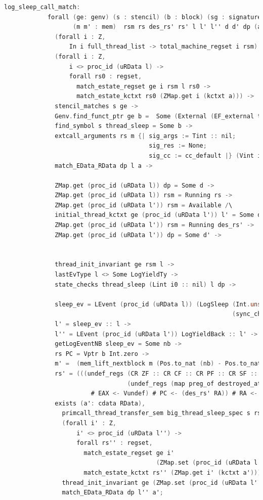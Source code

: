 \begin{lstlisting}[language=C]     
          log_sleep_call_match:
            forall (ge: genv) (s : stencil) (b : block) (sg : signature) 
                   (m m' : mem)  rsm rs des_rs' rs' l l' l'' d d' dp (a: cdata RData) nb sleep_ev i0,
              (forall i : Z,
                  In i full_thread_list -> total_machine_regset i rsm) ->
              (forall i : Z,
                  i <> proc_id (uRData l) ->
                  forall rs0 : regset,
                    match_estate_regset ge i rsm l rs0 ->
                    match_estate_kctxt rs0 (ZMap.get i (kctxt a))) ->
              stencil_matches s ge ->
              Genv.find_funct_ptr ge b =  Some (External (EF_external thread_sleep sg)) ->
              find_symbol s thread_sleep = Some b ->
              extcall_arguments rs m {| sig_args := Tint :: nil;
                                        sig_res := None;
                                        sig_cc := cc_default |} (Vint i0 :: nil) ->
              match_EData_RData dp l a ->
              
              ZMap.get (proc_id (uRData l)) dp = Some d ->
              ZMap.get (proc_id (uRData l)) rsm = Running rs ->
              ZMap.get (proc_id (uRData l')) rsm = Available /\
              initial_thread_kctxt ge (proc_id (uRData l')) l' = Some des_rs' \/
              ZMap.get (proc_id (uRData l')) rsm = Running des_rs' ->
              ZMap.get (proc_id (uRData l')) dp = Some d' ->


              thread_init_invariant ge rsm l ->
              lastEvType l <> Some LogYieldTy ->
              state_checks thread_sleep (Lint i0 :: nil) l dp ->

              sleep_ev = LEvent (proc_id (uRData l)) (LogSleep (Int.unsigned i0) (Mem.nextblock m)
                                                               (sync_chpool_check thread_sleep  (Lint i0 :: nil) (uRData l) d)) ->
              l' = sleep_ev :: l ->
              l'' = LEvent (proc_id (uRData l')) LogYieldBack :: l' ->
              getLogEventNB sleep_ev = Some nb ->
              rs PC = Vptr b Int.zero ->
              m' =  (mem_lift_nextblock m (Pos.to_nat (nb) - Pos.to_nat (Mem.nextblock m) % nat)) ->
              rs' = (((undef_regs (CR ZF :: CR CF :: CR PF :: CR SF :: CR OF :: nil)
                                  (undef_regs (map preg_of destroyed_at_call) des_rs'))
                        # EAX <- Vundef) # PC <- (des_rs' RA)) # RA <- Vundef ->
              exists (a': cdata RData),
                primcall_thread_transfer_sem big_thread_sleep_spec s rs (m, a) rs' (m', a') /\
                (forall i' : Z,
                    i' <> proc_id (uRData l'') ->
                    forall rs'' : regset,
                      match_estate_regset ge i'
                                          (ZMap.set (proc_id (uRData l'')) (Running rs') rsm) l'' rs'' ->
                      match_estate_kctxt rs'' (ZMap.get i' (kctxt a'))) /\
                thread_init_invariant ge (ZMap.set (proc_id (uRData l'')) (Running rs') rsm) l'' /\
                match_EData_RData dp l'' a';
\end{lstlisting}
         

